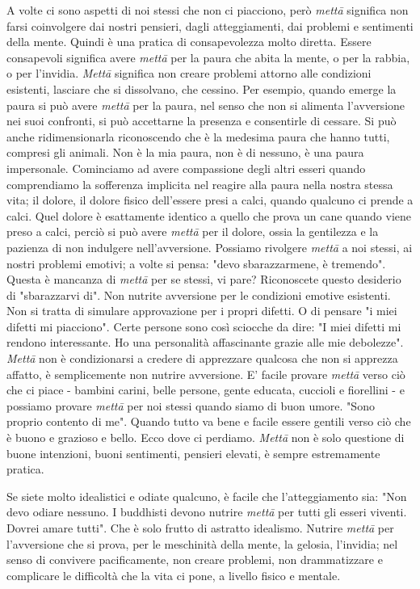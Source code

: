 A volte ci sono aspetti di noi stessi che non ci piacciono, però \textit{mettā}
significa non farsi coinvolgere dai nostri pensieri, dagli
atteggiamenti, dai problemi e sentimenti della mente. Quindi è una
pratica di consapevolezza molto diretta. Essere consapevoli significa
avere \textit{mettā} per la paura che abita la mente, o per la rabbia, o per
l'invidia. \textit{Mettā} significa non creare problemi attorno alle condizioni
esistenti, lasciare che si dissolvano, che cessino. Per esempio, quando
emerge la paura si può avere \textit{mettā} per la paura, nel senso che non si
alimenta l'avversione nei suoi confronti, si può accettarne la presenza
e consentirle di cessare. Si può anche ridimensionarla riconoscendo che
è la medesima paura che hanno tutti, compresi gli animali. Non è la mia
paura, non è di nessuno, è una paura impersonale. Cominciamo ad avere
compassione degli altri esseri quando comprendiamo la sofferenza
implicita nel reagire alla paura nella nostra stessa vita; il dolore, il
dolore fisico dell'essere presi a calci, quando qualcuno ci prende a
calci. Quel dolore è esattamente identico a quello che prova un cane
quando viene preso a calci, perciò si può avere \textit{mettā} per il dolore,
ossia la gentilezza e la pazienza di non indulgere nell'avversione.
Possiamo rivolgere \textit{mettā} a noi stessi, ai nostri problemi emotivi; a
volte si pensa: "devo sbarazzarmene, è tremendo". Questa è mancanza di
\textit{mettā} per se stessi, vi pare? Riconoscete questo desiderio di
"sbarazzarvi di". Non nutrite avversione per le condizioni emotive
esistenti. Non si tratta di simulare approvazione per i propri difetti.
O di pensare "i miei difetti mi piacciono". Certe persone sono così
sciocche da dire: "I miei difetti mi rendono interessante. Ho una
personalità affascinante grazie alle mie debolezze". \textit{Mettā} non è
condizionarsi a credere di apprezzare qualcosa che non si apprezza
affatto, è semplicemente non nutrire avversione. E' facile provare \textit{mettā}
verso ciò che ci piace - bambini carini, belle persone, gente educata,
cuccioli e fiorellini - e possiamo provare \textit{mettā} per noi stessi quando
siamo di buon umore. "Sono proprio contento di me". Quando tutto va bene
e facile essere gentili verso ciò che è buono e grazioso e bello. Ecco
dove ci perdiamo. \textit{Mettā} non è solo questione di buone intenzioni, buoni
sentimenti, pensieri elevati, è sempre estremamente pratica.

Se siete molto idealistici e odiate qualcuno, è facile che
l'atteggiamento sia: "Non devo odiare nessuno. I buddhisti devono
nutrire \textit{mettā} per tutti gli esseri viventi. Dovrei amare tutti". Che è
solo frutto di astratto idealismo. Nutrire \textit{mettā} per l'avversione che si
prova, per le meschinità della mente, la gelosia, l'invidia; nel senso
di convivere pacificamente, non creare problemi, non drammatizzare e
complicare le difficoltà che la vita ci pone, a livello fisico e
mentale.

